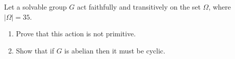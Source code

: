 \documentclass{article}
\begin{document}
\pagebreak

\begin{homeworkProblem}
    Let a solvable group $G$ act faithfully and
    transitively on the set $\Omega$, where $\lvert \Omega \rvert = 35$.
    \begin{enumerate}
        \item Prove that this action is not primitive.
        \item Show that if $G$ is abelian then it must be cyclic.
    \end{enumerate}
    
\end{homeworkProblem}
\end{document}
